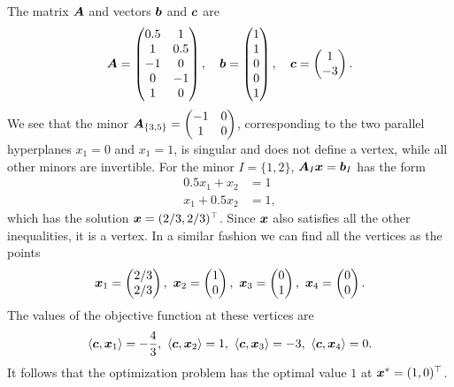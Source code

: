 \begin{example}
The matrix $\bm{A}$ and vectors $\bm{b}$ and $\bm{c}$ are
\begin{equation*}
 \bm{A} = \begin{pmatrix}
  0.5 & 1\\ 
  1 & 0.5\\
  -1 & 0\\
  0 & -1\\
  1 & 0
 \end{pmatrix},
\quad \bm{b} = \begin{pmatrix}
                 1\\ 1 \\ 0 \\ 0 \\ 1
                \end{pmatrix},
                \quad
                \bm{c} = \begin{pmatrix}
                           1 \\ -3
                          \end{pmatrix}.
\end{equation*}
We see that the minor $\bm{A}_{\{3,5\}}=\begin{pmatrix} -1 & 0\\ 1 & 0\end{pmatrix}$, corresponding to the two parallel hyperplanes $x_1=0$ and $x_1=1$, is singular and does not define a vertex, while all other minors are invertible. For the minor $I=\{1,2\}$, $\bm{A}_I\bm{x}=\bm{b}_I$ has the form
\begin{align*}
 0.5x_1+x_2 & = 1\\
 x_1+0.5x_2 & = 1,
\end{align*}
which has the solution $\bm{x}=(2/3,2/3)^{\top}$. Since $\bm{x}$ also satisfies all the other inequalities, it is a vertex. In a similar fashion we can find all the vertices as the points
\begin{equation*}
 \vct{x}_1 = \begin{pmatrix} 2/3\\ 2/3\end{pmatrix}, \ \vct{x}_2 = \begin{pmatrix} 1\\ 0\end{pmatrix}, \ \vct{x}_3 = \begin{pmatrix} 0\\ 1\end{pmatrix}, \ \vct{x}_4 = \begin{pmatrix} 0\\ 0\end{pmatrix}.
\end{equation*}
The values of the objective function at these vertices are
\begin{equation*}
 \ip{\vct{c}}{\vct{x}_1} = -\frac{4}{3}, \ \ip{\vct{c}}{\vct{x}_2} = 1, \ \ip{\vct{c}}{\vct{x}_3} = -3, \ \ip{\vct{c}}{\vct{x}_4} = 0.
\end{equation*}
It follows that the optimization problem has the optimal value $1$ at $\bm{x}^*=(1,0)^{\top}$.
\end{example}

